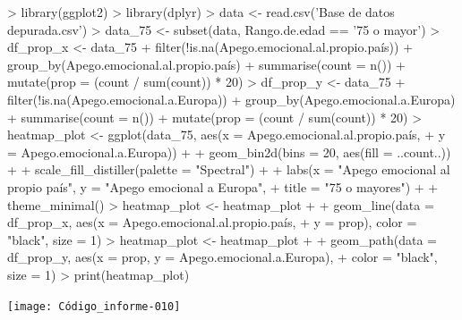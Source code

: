 \documentclass{article}
\begin{document}
\newpage
\begin{Schunk}
\begin{Sinput}
> library(ggplot2)
> library(dplyr)
> data <- read.csv('Base de datos depurada.csv')
> data_75 <- subset(data, Rango.de.edad == '75 o mayor')
> df_prop_x <- data_75 %
+   filter(!is.na(Apego.emocional.al.propio.país)) %
+   group_by(Apego.emocional.al.propio.país) %
+   summarise(count = n()) %
+   mutate(prop = (count / sum(count)) * 20)
> df_prop_y <- data_75 %
+   filter(!is.na(Apego.emocional.a.Europa)) %
+   group_by(Apego.emocional.a.Europa) %
+   summarise(count = n()) %
+   mutate(prop = (count / sum(count)) * 20)
> heatmap_plot <- ggplot(data_75, aes(x = Apego.emocional.al.propio.país,
+                                  y = Apego.emocional.a.Europa)) +
+   geom_bin2d(bins = 20, aes(fill = ..count..)) +
+   scale_fill_distiller(palette = "Spectral") +
+   labs(x = "Apego emocional al propio país", y = "Apego emocional a Europa",
+        title = "75 o mayores") +
+   theme_minimal()
> heatmap_plot <- heatmap_plot +
+   geom_line(data = df_prop_x, aes(x = Apego.emocional.al.propio.país,
+                                   y = prop), color = "black", size = 1)
> heatmap_plot <- heatmap_plot +
+   geom_path(data = df_prop_y, aes(x = prop, y = Apego.emocional.a.Europa),
+             color = "black", size = 1)
> print(heatmap_plot)
\end{Sinput}
\end{Schunk}
\texttt{[image: Código\_informe-010]}

\newpage
\end{document}
